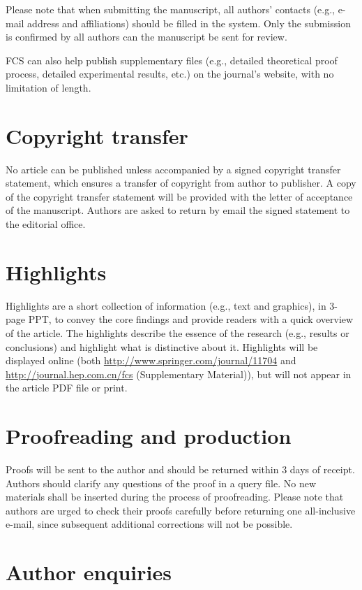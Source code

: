 \documentclass[review]{fcs}
\begin{document}
Please note that when submitting the manuscript, all authors' contacts (e.g., e-mail address and affiliations) should be filled in the system. Only the submission is confirmed by all authors can the manu\-script be sent for review. 

FCS can also help publish supplementary files (e.g., detailed theoretical proof process, detailed experimental results, etc.) on the journal’s website, with no limitation of length.  


\section{Copyright transfer}

No article can be published unless accompanied by a signed copyright transfer statement, which ensures a transfer of copyright from author to publisher. A copy of the copyright transfer statement will be provided with the letter of acceptance of the manuscript. Authors are asked to return by email the signed statement to the editorial office.

\section{Highlights}

Highlights are a short collection of information (e.g., text and graphics), in 3-page PPT, to convey the core findings and provide readers with a quick over\-view of the article. The highlights describe the essence of the research (e.g., results or conclusions) and highlight what is distinctive about it. Highlights will be displayed online (both \url{http://www.springer.com/journal/11704} and \url{http://}\break\url{journal.hep.com.cn/fcs} (Supplementary Material)), but will not appear in the article PDF file or print.

\section{Proofreading and production}

Proofs will be sent to the author and should be returned within 3 days of receipt. Authors should clarify any questions of the proof in a query file. No new materials shall be inserted during the process of proofreading. Please note that authors are urged to check their proofs carefully before returning one all-inclusive e-mail, since subsequent additional corrections will not be possible.

\section{Author enquiries}
\end{document}
